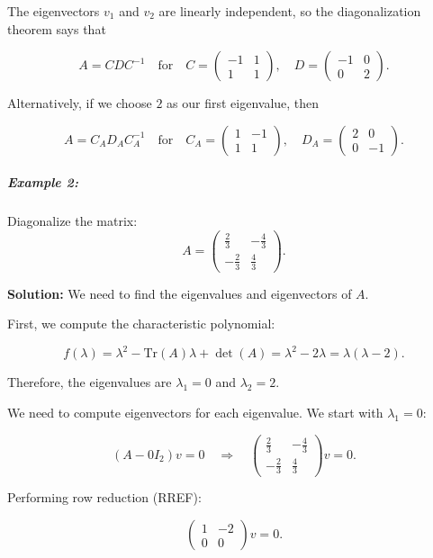 \documentclass[a4paper,12pt]{article}
\begin{document}
The eigenvectors \( v_1 \) and \( v_2 \) are linearly independent, so the diagonalization theorem says that

\[
A = C D C^{-1} \quad \text{for} \quad C = \begin{pmatrix} -1 & 1 \\ 1 & 1 \end{pmatrix}, \quad D = \begin{pmatrix} -1 & 0 \\ 0 & 2 \end{pmatrix}.
\]

Alternatively, if we choose \( 2 \) as our first eigenvalue, then

\[
A = C_A D_A C_A^{-1} \quad \text{for} \quad C_A = \begin{pmatrix} 1 & -1 \\ 1 & 1 \end{pmatrix}, \quad D_A = \begin{pmatrix} 2 & 0 \\ 0 & -1 \end{pmatrix}.
\]

\subparagraph{Example 2:}Diagonalize the matrix:
\[
A = \begin{pmatrix}
\frac{2}{3} & -\frac{4}{3} \\
-\frac{2}{3} & \frac{4}{3}
\end{pmatrix}.
\]

\textbf{Solution:} We need to find the eigenvalues and eigenvectors of \( A \).

First, we compute the characteristic polynomial:

\[
f(\lambda) = \lambda^2 - \text{Tr}(A) \lambda + \det(A) = \lambda^2 - 2\lambda = \lambda (\lambda - 2).
\]

Therefore, the eigenvalues are \( \lambda_1 = 0 \) and \( \lambda_2 = 2 \).

We need to compute eigenvectors for each eigenvalue. We start with \( \lambda_1 = 0 \):

\[
(A - 0I_2) v = 0 \quad \Rightarrow \quad \begin{pmatrix} \frac{2}{3} & -\frac{4}{3} \\ -\frac{2}{3} & \frac{4}{3} \end{pmatrix} v = 0.
\]

Performing row reduction (RREF):

\[
\begin{pmatrix} 1 & -2 \\ 0 & 0 \end{pmatrix} v = 0.
\]
\end{document}
